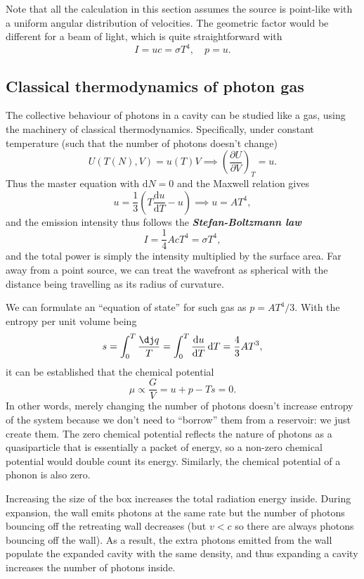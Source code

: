 \documentclass{article}
\theoremstyle{nonumberplain}
\begin{document}
Note that all the calculation in this section assumes the source is point-like with a uniform angular distribution of velocities. The geometric factor would be different for a beam of light, which is quite straightforward with
\[
    I = u c = \sigma T^4, \quad p = u. 
\]

\subsection{Classical thermodynamics of photon gas}
The collective behaviour of photons in a cavity can be studied like a gas, using the machinery of classical thermodynamics. Specifically, under constant temperature (such that the number of photons doesn't change)
\[
    U(T(N),V) = u(T) V \implies \left( \frac{\partial U}{\partial V} \right)_{T} = u. 
\]
Thus the master equation with $\mathrm{d} N = 0$ and the Maxwell relation gives
\[
    u = \frac{1}{3}\left(T \frac{\mathrm{d}u}{\mathrm{d}T} - u \right) \implies u = A T^4,
\]
and the emission intensity thus follows the \textit{\textbf{Stefan-Boltzmann law}} 
\[
    \boxed{I = \frac{1}{4} A c T^4 = \sigma T^4,}
\]
and the total power is simply the intensity multiplied by the surface area. Far away from a point source, we can treat the wavefront as spherical with the distance being travelling as its radius of curvature. 

We can formulate an ``equation of state'' for such gas as 
\(
    p = A T^4 /3 .
\)
With the entropy per unit volume being
\[
    s = \int_{0}^{T} \frac{\dj q}{T} = \int_{0}^{T} \frac{\mathrm{d}u}{\mathrm{d}T}  \,\mathrm{d}T = \frac{4}{3}A T^3,   
\]
it can be established that the chemical potential
\[
    \mu \propto \frac{G}{V} = u + p - T s = 0. 
\]
In other words, merely changing the number of photons doesn't increase entropy of the system because we don't need to ``borrow'' them from a reservoir: we just create them. The zero chemical potential reflects the nature of photons as a quasiparticle that is essentially a packet of energy, so a non-zero chemical potential would double count its energy. Similarly, the chemical potential of a phonon is also zero. 

Increasing the size of the box increases the total radiation energy inside. During expansion, the wall emits photons at the same rate but the number of photons bouncing off the retreating wall decreases (but $v < c$ so there are always photons bouncing off the wall). As a result, the extra photons emitted from the wall populate the expanded cavity with the same density, and thus expanding a cavity increases the number of photons inside. 
\end{document}
